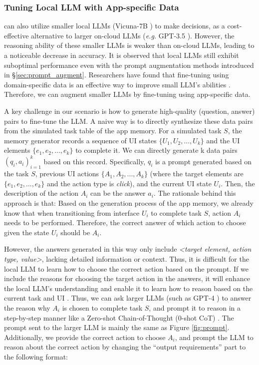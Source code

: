 \subsubsection{Tuning Local LLM with App-specific Data}
\label{sec:finetuning}
\name can also utilize smaller local LLMs (\eg Vicuna-7B \cite{vicuna2023}) to make decisions, as a cost-effective alternative to larger on-cloud LLMs (\textit{e.g.} GPT-3.5 \cite{chatgpt}).
However, the reasoning ability of these smaller LLMs is weaker than on-cloud LLMs, leading to a noticeable decrease in accuracy. It is observed that local LLMs still exhibit suboptimal performance even with the prompt augmentation methods introduced in \S \ref{sec:prompt_augment}. Researchers have found that fine-tuning using domain-specific data is an effective way to improve small LLM's abilities \cite{vicuna2023, alpaca}. Therefore, we can augment smaller LLMs by fine-tuning using app-specific data.

A key challenge in our scenario is how to generate high-quality (question, answer) pairs to fine-tune the LLM.
A naive way is to directly synthesize these data pairs from the simulated task table of the app memory. For a simulated task $S$, the memory generator records a sequence of UI states $\{U_1, U_2, ..., U_k\}$ and the UI elements $\{e_1, e_2, ..., e_k\}$ to complete it. 
We can directly generate k data pairs $(q_i, a_i)_{i=1}^k$ based on this record.
Specifically, $q_i$ is a prompt  generated based on the task $S$, previous UI actions $\{A_1, A_2, ..., A_k\}$ (where the target elements are $\{e_1, e_2, ..., e_k\}$ and the action type is \textit{click}), and the current UI state $U_i$. Then, the description of the action $A_i$ can be the answer $a_i$.
The rationale behind this approach is that: Based on the generation process of the app memory, we already know that when transitioning from interface $U_i$ to complete task $S$, action $A_i$ needs to be performed. Therefore, the correct answer of which action to choose given the state $U_i$ should be $A_i$.

However, the answers generated in this way only include \textit{<target element, action type, value>}, lacking detailed information or context. Thus, it is difficult for the local LLM to learn how to choose the correct action based on the prompt. 
If we include the reasons for choosing the target action in the answers, it will enhance the local LLM's understanding and enable it to learn how to reason based on the current task and UI \cite{LLMdistill}. 
Thus, we can ask larger LLMs (such as GPT-4 \cite{openai2023gpt4}) to answer the reason why $A_i$ is chosen to complete task $S$, and prompt it to reason in a step-by-step manner like a Zero-shot Chain-of-Thought (0-shot CoT) \cite{zero-shot-cot}. The prompt sent to the larger LLM is mainly the same as Figure \ref{fig:prompt}. Additionally, we provide the correct action to choose $A_i$, and prompt the LLM to reason about the correct action by changing the ``output requirements'' part to the following format:

